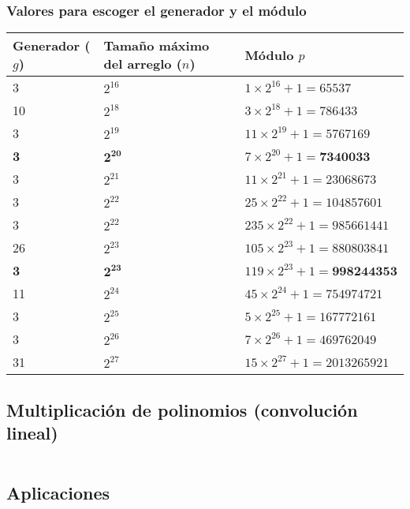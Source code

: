 \documentclass[11pt]{article}
\begin{document}
			\subsubsection{Valores para escoger el generador y el módulo}
				\begin{table}[H]
					\centering
					\begin{tabular}{|p{2.3cm}|p{2.7cm}|p{4.5cm}|}
						\hline
						Generador ($g$) & Tamaño máximo del arreglo ($n$) & Módulo $p$ \\ \hline
						3 & $2^{16}$ & $1 \times 2^{16} + 1 = 65537$ \\ \hline
						10 & $2^{18}$ & $3 \times 2^{18} + 1 = 786433$ \\ \hline
						3 & $2^{19}$ & $11 \times 2^{19} + 1 = 5767169$ \\ \hline
						\textbf{3} & $\mathbf{2^{20}}$ & $7 \times 2^{20} + 1 = \textbf{7340033}$ \\ \hline
						3 & $2^{21}$ & $11 \times 2^{21} + 1 = 23068673$ \\ \hline
						3 & $2^{22}$ & $25 \times 2^{22} + 1 = 104857601$ \\ \hline
						3 & $2^{22}$ & $235 \times 2^{22} + 1 = 985661441$ \\ \hline
						26 & $2^{23}$ & $105 \times 2^{23} + 1 = 880803841$ \\ \hline
						\textbf{3} & $\mathbf{2^{23}}$ & $119 \times 2^{23} + 1 = \textbf{998244353}$ \\ \hline
						11 & $2^{24}$ & $45 \times 2^{24} + 1 = 754974721$ \\ \hline
						3 & $2^{25}$ & $5 \times 2^{25} + 1 = 167772161$ \\ \hline
						3 & $2^{26}$ & $7 \times 2^{26} + 1 = 469762049$ \\ \hline
						31 & $2^{27}$ & $15 \times 2^{27} + 1 = 2013265921$ \\ \hline
					\end{tabular}
				\end{table}
			
		\subsection{Multiplicación de polinomios (convolución lineal)}
		\inputminted[tabsize=2,breaklines,firstline=85,lastline=110,fontsize=\small]{c++}{fft.cpp}
		
		\subsection{Aplicaciones}
\end{document}
